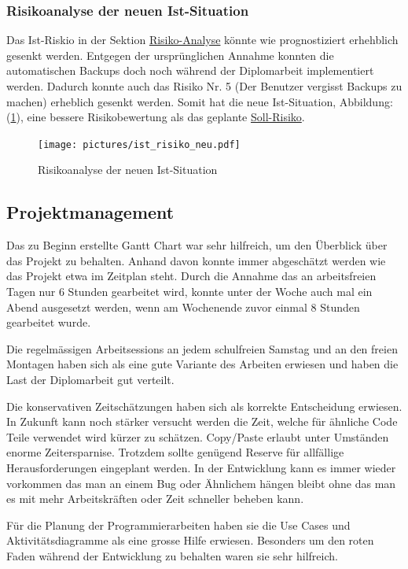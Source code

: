 \subsubsection{Risikoanalyse der neuen Ist-Situation}
\label{sec:orgc98cda5}

Das Ist-Riskio in der Sektion \hyperref[sec:org2347925]{Risiko-Analyse} könnte wie prognostiziert
erhehblich gesenkt werden. Entgegen der ursprünglichen Annahme konnten die
automatischen Backups doch noch während der Diplomarbeit implementiert werden.
Dadurch konnte auch das Risiko Nr. 5 (Der Benutzer vergisst Backups zu machen)
erheblich gesenkt werden. Somit hat die neue Ist-Situation,
Abbildung:(\ref{fig:org47eb5a8}), eine bessere Risikobewertung als das geplante
\hyperref[fig:org525577a]{Soll-Risiko}.

\begin{figure}[H]
\centering
\texttt{[image: pictures/ist\_risiko\_neu.pdf]}
\caption{\label{fig:org47eb5a8}
Risikoanalyse der neuen Ist-Situation}
\end{figure}

\subsection{Projektmanagement}
\label{sec:orgb68b222}

Das zu Beginn erstellte Gantt Chart war sehr hilfreich, um den Überblick über
das Projekt zu behalten. Anhand davon konnte immer abgeschätzt werden wie das
Projekt etwa im Zeitplan steht. Durch die Annahme das an arbeitsfreien Tagen
nur 6 Stunden gearbeitet wird, konnte unter der Woche auch mal ein Abend
ausgesetzt werden, wenn am Wochenende zuvor einmal 8 Stunden gearbeitet wurde.

Die regelmässigen Arbeitsessions an jedem schulfreien Samstag und an den freien
Montagen haben sich als eine gute Variante des Arbeiten erwiesen und haben die
Last der Diplomarbeit gut verteilt.

Die konservativen Zeitschätzungen haben sich als korrekte Entscheidung
erwiesen. In Zukunft kann noch stärker versucht werden die Zeit, welche für
ähnliche Code Teile verwendet wird kürzer zu schätzen. Copy/Paste erlaubt unter
Umständen enorme Zeitersparnise. Trotzdem sollte genügend Reserve für
allfällige Herausforderungen eingeplant werden. In der Entwicklung kann es
immer wieder vorkommen das man an einem Bug oder Ähnlichem hängen bleibt ohne
das man es mit mehr Arbeitskräften oder Zeit schneller beheben kann.

Für die Planung der Programmierarbeiten haben sie die Use Cases und
Aktivitätsdiagramme als eine grosse Hilfe erwiesen. Besonders um den roten Faden
während der Entwicklung zu behalten waren sie sehr hilfreich.

